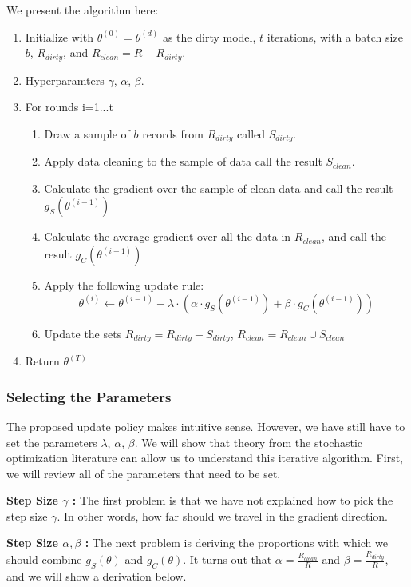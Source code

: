 We present the algorithm here:
\begin{enumerate}[noitemsep]
\item Initialize with $\theta^{(0)} = \theta^{(d)}$ as the dirty model, $t$ iterations, with a batch size $b$, $R_{dirty}$, and $R_{clean} = R - R_{dirty}$.
\item Hyperparamters $\gamma$, $\alpha$, $\beta$.
\item For rounds i=1...t
\begin{enumerate}
	\item Draw a sample of $b$ records from $R_{dirty}$ called $S_{dirty}$.
	\item Apply data cleaning to the sample of data call the result $S_{clean}$.
	\item Calculate the gradient over the sample of clean data and call the result $g_S(\theta^{(i-1)})$
	\item Calculate the average gradient over all the data in $R_{clean}$, and call the result $g_C(\theta^{(i-1)})$
	\item Apply the following update rule:
	\[
	\theta^{(i)} \leftarrow \theta^{(i-1)} - \lambda \cdot(\alpha\cdot g_S(\theta^{(i-1)}) + \beta \cdot  g_C(\theta^{(i-1)}))
	\]
	\item Update the sets $R_{dirty} = R_{dirty} - S_{dirty}$, $R_{clean} = R_{clean} \cup S_{clean}$
\end{enumerate}
\item Return $\theta^{(T)}$
\end{enumerate} 

\subsubsection{Selecting the Parameters}
The proposed update policy makes intuitive sense.
However, we have still have to set the parameters $\lambda$, $\alpha$, $\beta$.
We will show that theory from the stochastic optimization literature can allow us to understand this iterative algorithm.
First, we will review all of the parameters that need to be set.

\vspace{0.5em}

\noindent\textbf{Step Size $\gamma$ : } The first problem is that we have not explained how to pick the step size $\gamma$. In other words, how far should we travel in the gradient direction.

\vspace{0.5em}

\noindent\textbf{Step Size $\alpha,\beta$ : } The next problem is deriving the proportions with which we should combine $g_S(\theta)$ and $g_C(\theta)$. It turns out that $\alpha = \frac{R_{clean}}{R}$ and $\beta = \frac{R_{dirty}}{R}$, and we will show a derivation below.

